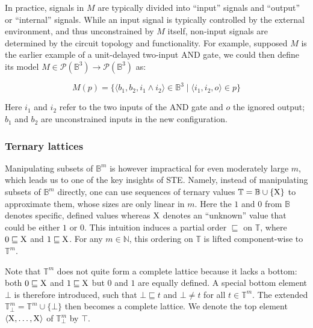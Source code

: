 In practice, signals in $M$ are typically divided into ``input'' signals and ``output'' or ``internal'' signals. While an input signal is typically controlled by the external environment, and thus unconstrained by $M$ itself, non-input signals are determined by the circuit topology and functionality. For example, supposed $M$ is the earlier example of a unit-delayed two-input AND gate, we could then define its model $M \in \mathcal{P}(\mathbb{B}^{3}) \rightarrow \mathcal{P}(\mathbb{B}^{3})$ as:


\begin{equation*}
M(p) = \{ \langle b_{1}, b_{2}, i_{1} \wedge i_{2} \rangle \in \mathbb{B}^{3} \mid \langle i_{1}, i_{2}, o \rangle \in p \}
\end{equation*}

\noindent Here $i_{1}$ and $i_{2}$ refer to the two inputs of the AND gate and $o$ the ignored output; $b_{1}$ and $b_{2}$ are unconstrained inputs in the new configuration.

\subsubsection{Ternary lattices}

Manipulating subsets of $\mathbb{B}^{m}$ is however impractical for even moderately large $m$, which leads us to one of the key insights of STE. Namely, instead of manipulating subsets of $\mathbb{B}^{m}$ directly, one can use sequences of ternary values $\mathbb{T} = \mathbb{B} \cup \{ \mathrm{X} \} $ to approximate them, whose sizes are only linear in $m$. Here the $1$ and $0$ from $\mathbb{B}$ denotes specific, defined values whereas $\mathrm{X}$ denotes an ``unknown'' value that could be either $1$ or $0$. This intuition induces a partial order $\sqsubseteq$ on $\mathbb{T}$, where $0 \sqsubseteq \mathrm{X}$ and $1 \sqsubseteq \mathrm{X}$\footnotemark. For any $m \in \mathbb{N}$, this ordering on $\mathbb{T}$ is lifted component-wise to $\mathbb{T}^{m}$.



Note that $\mathbb{T}^{m}$ does not quite form a complete lattice because it lacks a bottom: both $0 \sqsubseteq \mathrm{X}$ and $1 \sqsubseteq \mathrm{X}$ but $0$ and $1$ are equally defined. A special bottom element $\bot$ is therefore introduced, such that $\bot \sqsubseteq t$ and $\bot \neq t$ for all $t \in \mathbb{T}^{m}$. The extended $\mathbb{T}_{\bot}^{m} = \mathbb{T}^{m} \cup \{ \bot \}$ then becomes a complete lattice. We denote the top element $\langle \mathrm{X}, \dots, \mathrm{X} \rangle$ of $\mathbb{T}_{\bot}^{m}$ by $\top$.

